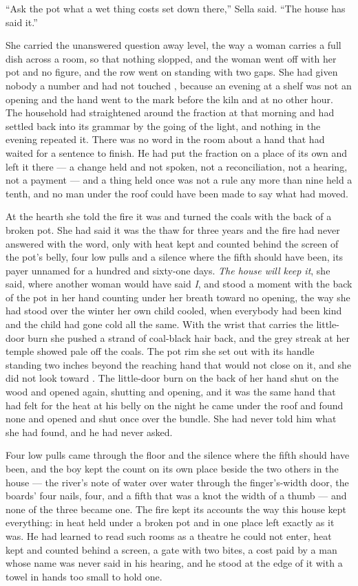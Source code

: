 “Ask the pot what a wet thing costs set down there,” Sella said. “The house has said it.”

She carried the unanswered question away level, the way a woman carries a full dish across a room, so that nothing slopped, and the woman went off with her pot and no figure, and the row went on standing with two gaps. She had given nobody a number and had not touched , because an evening at a shelf was not an opening and the hand went to the mark before the kiln and at no other hour. The household had straightened around the fraction at  that morning and had settled back into its grammar by the going of the light, and nothing in the evening repeated it. There was no word in the room about a hand that had waited for a sentence to finish. He had put the fraction on a place of its own and left it there --- a change held and not spoken, not a reconciliation, not a hearing, not a payment --- and a thing held once was not a rule any more than nine held a tenth, and no man under the roof could have been made to say what had moved.

\scenebreak

At the hearth she told the fire it was  and turned the coals with the back of a broken pot. She had said it was the thaw for three years and the fire had never answered with the word, only with heat kept and counted behind the screen of the pot's belly, four low pulls and a silence where the fifth should have been, its payer unnamed for a hundred and sixty-one days. \emph{The house will keep it}, she said, where another woman would have said \emph{I}, and stood a moment with the back of the pot in her hand counting under her breath toward no opening, the way she had stood over the winter her own child cooled, when everybody had been kind and the child had gone cold all the same. With the wrist that carries the little-door burn she pushed a strand of coal-black hair back, and the grey streak at her temple showed pale off the coals. The pot rim she set out with its handle standing two inches beyond the reaching hand that would not close on it, and she did not look toward . The little-door burn on the back of her hand shut on the wood and opened again, shutting and opening, and it was the same hand that had felt for the heat at his belly on the night he came under the roof and found none and opened and shut once over the bundle. She had never told him what she had found, and he had never asked.

Four low pulls came through the floor and the silence where the fifth should have been, and the boy kept the count on its own place beside the two others in the house --- the river's note of water over water through the finger's-width door, the boards' four nails, four, and a fifth that was a knot the width of a thumb --- and none of the three became one. The fire kept its accounts the way this house kept everything: in heat held under a broken pot and in one place left exactly as it was. He had learned to read such rooms as a theatre he could not enter, heat kept and counted behind a screen, a gate with two bites, a cost paid by a man whose name was never said in his hearing, and he stood at the edge of it with a towel in hands too small to hold one.


